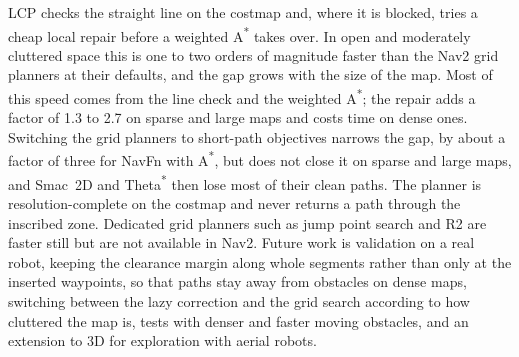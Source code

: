 \documentclass[conference]{IEEEtran}
\newcommand{\lcp}{LCP}
\begin{document}
\lcp{} checks the straight line on the costmap and, where it is blocked, tries a
cheap local repair before a weighted A\textsuperscript{*} takes over. In open and
moderately cluttered space this is one to two orders of magnitude faster than the
Nav2 grid planners at their defaults, and the gap grows with the size of the map. Most of this speed
comes from the line check and the weighted A\textsuperscript{*}; the repair adds a
factor of 1.3 to 2.7 on sparse and large maps and costs time on dense ones.
Switching the grid planners to short-path objectives narrows the gap, by about a
factor of three for NavFn with A\textsuperscript{*}, but does not close it on sparse
and large maps, and Smac~2D and Theta\textsuperscript{*} then lose most of their
clean paths. The planner is resolution-complete
on the costmap and never returns a path through the inscribed zone. Dedicated grid
planners such as jump point search and R2 are faster still but are not available in
Nav2. Future work is validation on a real
robot, keeping the clearance margin along whole segments rather than only at the
inserted waypoints, so that paths stay away from obstacles on dense maps,
switching between the lazy correction and the grid search according to how
cluttered the map is, tests with denser and faster moving obstacles, and an
extension to 3D for exploration with aerial robots.



\end{document}
